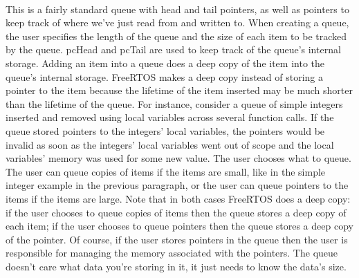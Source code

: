 \begin{description}
\os{\newpage}



\item[{\rot\bf Queues}]~\\[-3ex]
\bi
\ite This is a fairly standard queue with head and tail pointers, as well as pointers to keep track of where we've just read from and written to.
\ite
\ite When creating a queue, the user specifies the length of the queue and the size of each item to be tracked by the queue. pcHead and pcTail are used to keep track of the queue's internal storage. Adding an item into a queue does a deep copy of the item into the queue's internal storage.
\ite
\ite FreeRTOS makes a deep copy instead of storing a pointer to the item because the lifetime of the item inserted may be much shorter than the lifetime of the queue. For instance, consider a queue of simple integers inserted and removed using local variables across several function calls. If the queue stored pointers to the integers' local variables, the pointers would be invalid as soon as the integers' local variables went out of scope and the local variables' memory was used for some new value.
\ite
\ite The user chooses what to queue. The user can queue copies of items if the items are small, like in the simple integer example in the previous paragraph, or the user can queue pointers to the items if the items are large. Note that in both cases FreeRTOS does a deep copy: if the user chooses to queue copies of items then the queue stores a deep copy of each item; if the user chooses to queue pointers then the queue stores a deep copy of the pointer. Of course, if the user stores pointers in the queue then the user is responsible for managing the memory associated with the pointers. The queue doesn't care what data you're storing in it, it just needs to know the data's size.
\ei

\os{\newpage}




\end{description}
